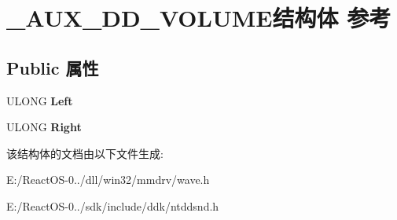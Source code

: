\hypertarget{struct___a_u_x___d_d___v_o_l_u_m_e}{}\section{\+\_\+\+A\+U\+X\+\_\+\+D\+D\+\_\+\+V\+O\+L\+U\+M\+E结构体 参考}
\label{struct___a_u_x___d_d___v_o_l_u_m_e}
\subsection*{Public 属性}
\begin{DoxyCompactItemize}
\item 
\mbox{\label{struct___a_u_x___d_d___v_o_l_u_m_e_a64dc3462f2cf129ab69a6a6ccb43c8d0}} 
U\+L\+O\+NG {\bfseries Left}
\item 
\mbox{\label{struct___a_u_x___d_d___v_o_l_u_m_e_a0574234973aed0566ac492d1c90528c8}} 
U\+L\+O\+NG {\bfseries Right}
\end{DoxyCompactItemize}


该结构体的文档由以下文件生成\+:\begin{DoxyCompactItemize}
\item 
E\+:/\+React\+O\+S-\/0../dll/win32/mmdrv/wave.\+h\item 
E\+:/\+React\+O\+S-\/0../sdk/include/ddk/ntddsnd.\+h\end{DoxyCompactItemize}

